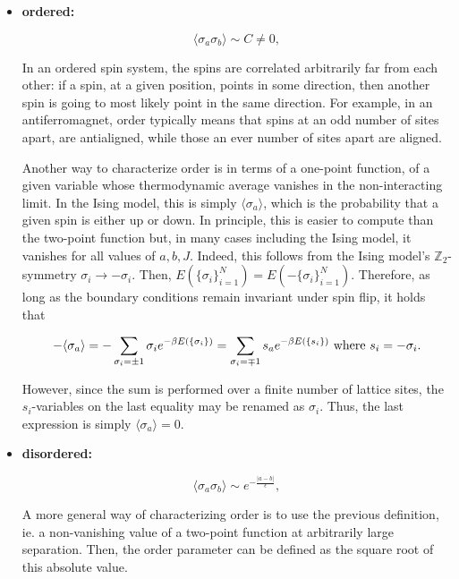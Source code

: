 \documentclass{homework}
\begin{document}
\begin{itemize}
    \item \textbf{ordered:} 
    
    $$
      \langle \sigma_a \sigma_b \rangle \sim C \neq 0,
    $$
    
    
In an ordered spin system, the spins are correlated arbitrarily far from each other: if a spin, at a given position, points in some direction, then another spin is going to most likely point in the same direction. For example, in an antiferromagnet, order typically means that spins at an odd number of sites apart, are antialigned, while those an ever number of sites apart are aligned. 

Another way to characterize order is in terms of a one-point function, of a given variable whose thermodynamic average vanishes in the non-interacting limit. In the Ising model, this is simply $\langle \sigma_a \rangle$, which is the probability that a given spin is either up or down. In principle, this is easier to compute than the two-point function but, in many cases including the Ising model, it vanishes for all values of $a, b, J$. Indeed, this follows from the Ising model's $\mathds{Z}_2$-symmetry $    \sigma_i \rightarrow -\sigma_i$. Then, $E(\{\sigma_i\}_{i=1}^{N}) =  E(-\{\sigma_i\}_{i=1}^{N})$. Therefore, as long as the boundary conditions remain invariant under spin flip, it holds that 

\begin{equation}
    -\langle \sigma_a \rangle = - \sum_{\sigma_i = \pm 1} \sigma_i e^{-\beta E(\{\sigma_i\})} = \sum_{\sigma_i = \mp 1} s_a e^{-\beta E(\{s_i\})} \textnormal{ where } s_i = -\sigma_i.
\end{equation}

However, since the sum is performed over a finite number of lattice sites, the $s_i$-variables on the last equality may be renamed as $\sigma_i$. Thus, the last expression is simply $\langle \sigma_a \rangle=0$. \\
    
    \item \textbf{disordered:} 
    
    $$
      \langle \sigma_a \sigma_b \rangle \sim e^{-\frac{|a-b|}{\epsilon}},
    $$
    
    A more general way of characterizing order is to use the previous definition, ie. a non-vanishing value of a two-point function at arbitrarily large separation. Then, the order parameter can be defined as the square root of this absolute value. \\
    

\end{itemize}
\end{document}

